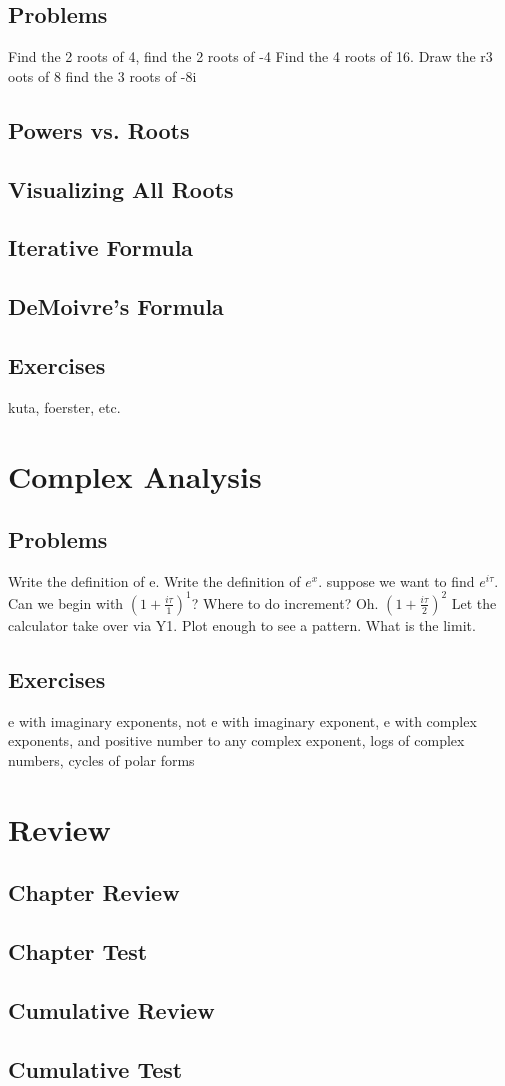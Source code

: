 \subsection{Problems}
Find the 2 roots of 4, find the 2 roots of -4
Find the 4 roots of 16.  Draw the r3 oots of 8
find the 3 roots of -8i
\newpage
\subsection{Powers vs. Roots}
\subsection{Visualizing All Roots}
\subsection{Iterative Formula}
\subsection{DeMoivre's Formula}
\newpage
\subsection{Exercises}
kuta, foerster, etc.


\newpage
\section{Complex Analysis}
\subsection{Problems}
Write the definition of e.  Write the definition of $e^x$.  suppose we want to find
$e^{i\tau}$.  Can we begin with $(1+\frac{i\tau}{1})^1$?  Where to do increment?
Oh.  $(1+\frac{i\tau}{2})^2$  Let the calculator take over via Y1.  Plot enough to see a
pattern.  What is the limit. 
\newpage

\newpage
\subsection{Exercises}
e with imaginary exponents,  not e with imaginary exponent, 
e with complex exponents, and positive number to any complex exponent,
logs of complex numbers, cycles of polar forms




\newpage
\section{Review}
\subsection{Chapter Review}
\subsection{Chapter Test}
\subsection{Cumulative Review}
\subsection{Cumulative Test}


